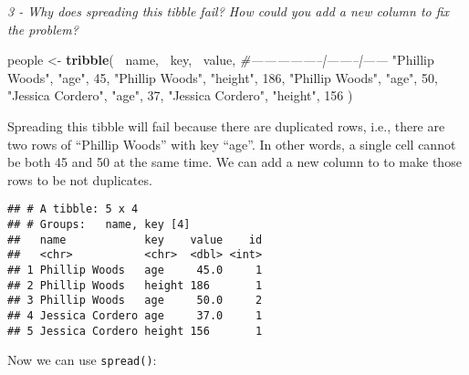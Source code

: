 \documentclass[]{article}
\newenvironment{Shaded}{\begin{snugshade}}{\end{snugshade}}
\newcommand{\KeywordTok}[1]{\textcolor[rgb]{0.13,0.29,0.53}{\textbf{#1}}}
\newcommand{\DataTypeTok}[1]{\textcolor[rgb]{0.13,0.29,0.53}{#1}}
\newcommand{\DecValTok}[1]{\textcolor[rgb]{0.00,0.00,0.81}{#1}}
\newcommand{\StringTok}[1]{\textcolor[rgb]{0.31,0.60,0.02}{#1}}
\newcommand{\CommentTok}[1]{\textcolor[rgb]{0.56,0.35,0.01}{\textit{#1}}}
\newcommand{\OperatorTok}[1]{\textcolor[rgb]{0.81,0.36,0.00}{\textbf{#1}}}
\newcommand{\NormalTok}[1]{#1}
\theoremstyle{definition}
\theoremstyle{definition}
\theoremstyle{definition}
\theoremstyle{remark}
\begin{document}
\emph{3 - Why does spreading this tibble fail? How could you add a new
column to fix the problem?}

\begin{Shaded}
\begin{Highlighting}[]
\NormalTok{people <-}\StringTok{ }\KeywordTok{tribble}\NormalTok{(}
  \OperatorTok{~}\NormalTok{name,             }\OperatorTok{~}\NormalTok{key,    }\OperatorTok{~}\NormalTok{value,}
  \CommentTok{#-----------------|--------|------}
  \StringTok{"Phillip Woods"}\NormalTok{,   }\StringTok{"age"}\NormalTok{,       }\DecValTok{45}\NormalTok{,}
  \StringTok{"Phillip Woods"}\NormalTok{,   }\StringTok{"height"}\NormalTok{,   }\DecValTok{186}\NormalTok{,}
  \StringTok{"Phillip Woods"}\NormalTok{,   }\StringTok{"age"}\NormalTok{,       }\DecValTok{50}\NormalTok{,}
  \StringTok{"Jessica Cordero"}\NormalTok{, }\StringTok{"age"}\NormalTok{,       }\DecValTok{37}\NormalTok{,}
  \StringTok{"Jessica Cordero"}\NormalTok{, }\StringTok{"height"}\NormalTok{,   }\DecValTok{156}
\NormalTok{)}
\end{Highlighting}
\end{Shaded}

Spreading this tibble will fail because there are duplicated rows, i.e.,
there are two rows of ``Phillip Woods'' with key ``age''. In other
words, a single cell cannot be both 45 and 50 at the same time. We can
add a new column to to make those rows to be not duplicates.

\begin{Shaded}
\end{Shaded}

\begin{verbatim}
## # A tibble: 5 x 4
## # Groups:   name, key [4]
##   name            key    value    id
##   <chr>           <chr>  <dbl> <int>
## 1 Phillip Woods   age     45.0     1
## 2 Phillip Woods   height 186       1
## 3 Phillip Woods   age     50.0     2
## 4 Jessica Cordero age     37.0     1
## 5 Jessica Cordero height 156       1
\end{verbatim}

Now we can use \texttt{spread()}:

\begin{Shaded}
\end{Shaded}
\end{document}
